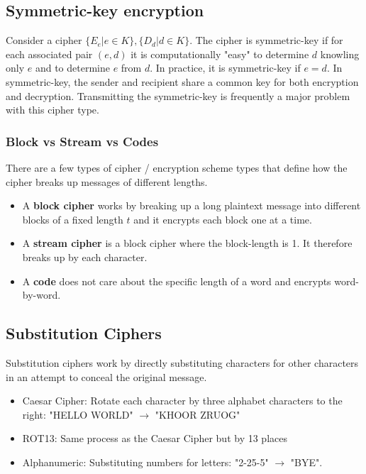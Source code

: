\documentclass[11pt]{article}
\begin{document}
\subsection{Symmetric-key encryption}
Consider a cipher $\{ E_e | e \in K \}, \{ D_d | d \in K  \}$.
The cipher is symmetric-key if for each associated pair $(e,d)$ it is computationally "easy" to determine $d$ knowling only $e$ and to determine $e$ from $d$.
In practice, it is symmetric-key if $e=d$.
In symmetric-key, the sender and recipient share a common key for both encryption and decryption.
Transmitting the symmetric-key is frequently a major problem with this cipher type.

\subsubsection{Block vs Stream vs Codes}
There are a few types of cipher / encryption scheme types that define how the cipher breaks up messages of different lengths.
\begin{itemize}
    \item A \textbf{block cipher} works by breaking up a long plaintext message into different blocks of a fixed length $t$ and it encrypts each block one at a time.
    \item A \textbf{stream cipher} is a block cipher where the block-length is 1. It therefore breaks up by each character.
    \item A \textbf{code} does not care about the specific length of a word and encrypts word-by-word.
\end{itemize}

\subsection{Substitution Ciphers}

Substitution ciphers work by directly substituting characters for other characters in an attempt to conceal the original message.
\begin{itemize}
    \item Caesar Cipher: Rotate each character by three alphabet characters to the right: "HELLO WORLD" $\longrightarrow$ "KHOOR ZRUOG"
    \item ROT13: Same process as the Caesar Cipher but by 13 places
    \item Alphanumeric: Substituting numbers for letters: "2-25-5" $\longrightarrow$ "BYE".
\end{itemize}
\end{document}
